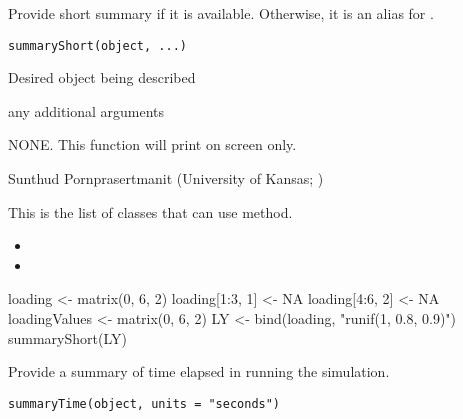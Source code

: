\documentclass[a4paper]{book}
\begin{document}
%
\begin{Description}\relax
Provide short summary if it is available. Otherwise, it is an alias for .
\end{Description}
%
\begin{Usage}
\begin{verbatim}
summaryShort(object, ...)
\end{verbatim}
\end{Usage}
%
\begin{Arguments}
\begin{ldescription}
\item[\code{object}] 
Desired object being described

\item[\code{...}] 
any additional arguments

\end{ldescription}
\end{Arguments}
%
\begin{Value}
NONE. This function will print on screen only.
\end{Value}
%
\begin{Author}\relax
Sunthud Pornprasertmanit (University of Kansas; )
\end{Author}
%
\begin{SeeAlso}\relax
This is the list of classes that can use  method.
\begin{itemize}

\item {}
\item {}

\end{itemize}

\end{SeeAlso}
%
\begin{Examples}
\begin{ExampleCode}
loading <- matrix(0, 6, 2)
loading[1:3, 1] <- NA
loading[4:6, 2] <- NA
loadingValues <- matrix(0, 6, 2)
LY <- bind(loading, "runif(1, 0.8, 0.9)")
summaryShort(LY)
\end{ExampleCode}
\end{Examples}
%
\begin{Description}\relax
Provide a summary of time elapsed in running the simulation.
\end{Description}
%
\begin{Usage}
\begin{verbatim}
summaryTime(object, units = "seconds")
\end{verbatim}
\end{Usage}
\end{document}
